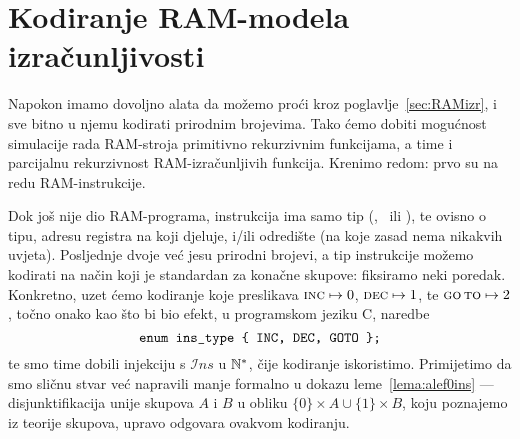 \section{Kodiranje RAM-modela izračunljivosti}

Napokon imamo dovoljno alata da možemo proći kroz poglavlje~\ref{sec:RAMizr}, i sve bitno u njemu kodirati prirodnim brojevima. Tako ćemo dobiti mogućnost simulacije rada RAM-stroja primitivno rekurzivnim funkcijama, a time i parcijalnu rekurzivnost RAM-izračunljivih funkcija. Krenimo redom: prvo su na redu RAM-instrukcije.


Dok još nije dio RAM-programa, instrukcija ima samo tip (\inc, \dec\ ili \goto), te ovisno o tipu, adresu registra na koji djeluje, i\slash ili odredište (na koje zasad nema nikakvih uvjeta). Posljednje dvoje već jesu prirodni brojevi, a tip instrukcije možemo kodirati na način koji je standardan za konačne skupove: fiksiramo neki poredak. Konkretno, uzet ćemo kodiranje koje preslikava $\textsc{inc}\mapsto0$, $\textsc{dec}\mapsto1$, te $\textsc{go\,to}\mapsto2$, točno onako kao što bi bio efekt, u programskom jeziku C, naredbe
\begin{equation}
\texttt{enum ins\_type \string{ INC, DEC, GOTO \string};}
\end{equation}
te smo time dobili injekciju s $\mathcal Ins$ u ${\mathbb N}^*$, čije kodiranje iskoristimo. Primijetimo da smo sličnu stvar već napravili manje formalno u dokazu leme~\ref{lema:alef0ins} --- disjunktifikacija unije skupova $A$ i $B$ u obliku $\{0\}\times A\cup\{1\}\times B$, koju poznajemo iz teorije skupova, upravo odgovara ovakvom kodiranju.

